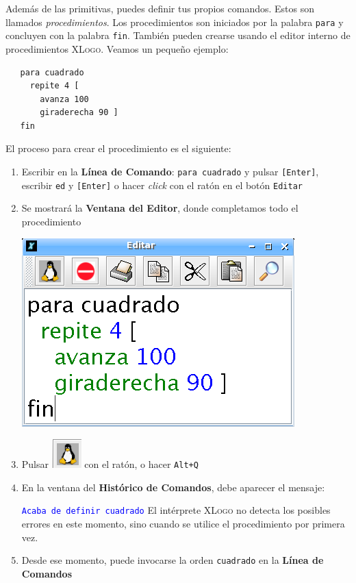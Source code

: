 Adem\'as de las primitivas, puedes definir tus propios comandos. Estos
son llamados \textit{procedimientos}. Los procedimientos son iniciados
por la palabra \texttt{para}  y concluyen
con la palabra \texttt{fin}.  Tambi\'en pueden
crearse usando el editor interno de procedimientos \textsc{XLogo}. Veamos
un peque\~no ejemplo:
\begin{verbatim}
   para cuadrado
     repite 4 [
       avanza 100
       giraderecha 90 ]
   fin \end{verbatim}
El proceso para crear el procedimiento es el siguiente:
\begin{enumerate}
   \item Escribir en la \textbf{L\'inea de Comando}: \texttt{para cuadrado}
      y pulsar \texttt{[Enter]}, escribir \texttt{ed} 
      y \texttt{[Enter]} o hacer \textit{click} con el rat\'on en el bot\'on 
      \texttt{Editar}
   \item Se mostrar\'a la \textbf{Ventana del Editor},
      donde completamos todo el procedimiento
      \begin{center}
         \includegraphics[scale=0.4]{Imagenes/04_Convenciones/EditorProc_01.png}
      \end{center}
   \item Pulsar \includegraphics[scale=0.3]{Imagenes/04_Convenciones/guardar.png} con el
      rat\'on, o hacer \texttt{Alt+Q}
   \item En la ventana del \textbf{Hist\'orico de Comandos},
       debe aparecer el mensaje:

      \textcolor{blue}{\texttt{Acaba de definir cuadrado}}
      El int\'erprete \textsc{XLogo} no detecta los posibles errores en este
      momento, sino cuando se utilice el procedimiento por primera vez.
   \item Desde ese momento, puede invocarse la orden \texttt{cuadrado} en la
      \textbf{L\'inea de Comandos}
\end{enumerate}

